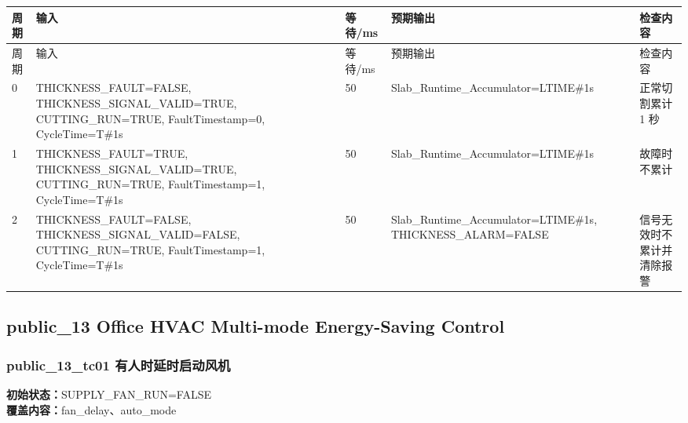\begin{longtable}{L{1.0cm}L{4.7cm}L{1.4cm}L{4.0cm}L{2.1cm}}

\toprule

周期 & 输入 & 等待/ms & 预期输出 & 检查内容\\

\midrule

\endfirsthead

\toprule

周期 & 输入 & 等待/ms & 预期输出 & 检查内容\\

\midrule

\endhead

0 & THICKNESS\_FAULT=FALSE, THICKNESS\_SIGNAL\_VALID=TRUE, CUTTING\_RUN=TRUE, FaultTimestamp=0, CycleTime=T\#1s & 50 & Slab\_Runtime\_Accumulator=LTIME\#1s & 正常切割累计 1 秒\\

1 & THICKNESS\_FAULT=TRUE, THICKNESS\_SIGNAL\_VALID=TRUE, CUTTING\_RUN=TRUE, FaultTimestamp=1, CycleTime=T\#1s & 50 & Slab\_Runtime\_Accumulator=LTIME\#1s & 故障时不累计\\

2 & THICKNESS\_FAULT=FALSE, THICKNESS\_SIGNAL\_VALID=FALSE, CUTTING\_RUN=TRUE, FaultTimestamp=1, CycleTime=T\#1s & 50 & Slab\_Runtime\_Accumulator=LTIME\#1s, THICKNESS\_ALARM=FALSE & 信号无效时不累计并清除报警\\

\bottomrule

\end{longtable}

\subsection{{\ttfamily public\_13} Office HVAC Multi-mode Energy-Saving Control}

\subsubsection{{\ttfamily public\_13\_tc01} 有人时延时启动风机}

\noindent\textbf{初始状态：}SUPPLY\_FAN\_RUN=FALSE\\

\textbf{覆盖内容：}fan\_delay、auto\_mode

